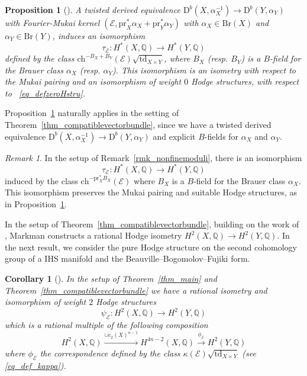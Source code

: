 \documentclass[12pt,a4paper]{amsart}
\theoremstyle{plain}
\newtheorem{prop}[thm]{Proposition}
\newtheorem{cor}[thm]{Corollary}
\theoremstyle{definition}
\theoremstyle{remark}
\newtheorem{rmk}[thm]{Remark}
\def\td{\operatorname{td}}
\def\ch{\mathrm{ch}}
\def\H{H}
\def\pr{\mathrm{pr}}
\def\QQ{\mathbb{Q}}
\newcommand{\D}{\mathrm{D}^b}
\newcommand{\kE}{\mathcal{E}}
\newcommand{\Br}{\mathrm{Br}}
\newcommand{\rathodge}[1]{\psi_{#1}}
\newcommand{\cc}{c}
\begin{document}
\begin{prop}[{\cite[Section 4, 4) and 5)]{paolo_huy}}]\label{huystellari}
    A twisted derived equivalence $\D(X,\alpha_X^{-1})\to \D(Y,\alpha_Y)$ with Fourier-Mukai kernel $(\kE,\pr_X^*\alpha_X+\pr_Y^*{\alpha_Y})$ with $\alpha_X\in \Br(X)$ and $\alpha_Y\in\Br(Y)$, induces an isomorphism
    \[
    \tau_{\kE}\colon H^*(X,\QQ)\to H^*(Y,\QQ)
    \]
    defined by the class $\ch^{-B_X+B_Y}(\kE)\sqrt{\td_{X\times Y}}$, where $B_X$ (resp. $B_Y$) is a $B$-field for the Brauer class $\alpha_X$ (resp. $\alpha_Y$). 
    This isomorphism is an isometry with respect to the Mukai pairing and an isomorphism of weight $0$ Hodge structures, with respect to ~\eqref{eq_defzeroHstru}.
\end{prop}


Proposition~\ref{huystellari} naturally applies in the setting of Theorem~\ref{thm_compatiblevectorbundle}, since we have a twisted derived equivalence $\D(X,\alpha_X^{-1})\rightarrow\D(Y,\alpha_Y)$ and explicit $B$-fields for $\alpha_X$ and $\alpha_Y$.

\begin{rmk}\label{rmk_iso_nonfine}
    In the setup of Remark~\ref{rmk_nonfinemoduli}, there is an isomorphism
    \[
    \tau_{\kE}\colon H^*(X,\QQ)\to H^*(Y,\QQ)
    \]
    induced by the class $\ch^{-\pr_X^*B_X}(\kE)$ where $B_X$ is a $B$-field for the Brauer class $\alpha_X$. This isomorphism preserves the Mukai pairing and suitable Hodge structures, as in Proposition~\ref{huystellari}.
\end{rmk}


In the setup of Theorem~\ref{thm_compatiblevectorbundle}, building on the work of \cite{tae23}, Markman constructs a rational Hodge isometry $H^2(X,\mathbb{Q})\rightarrow H^2(Y,\mathbb{Q})$. In the next result, we consider the pure Hodge structure on the second cohomology group of a IHS manifold and the Beauville--Bogomolov--Fujiki form.

\begin{cor}[{\cite[Lemma 4.1 and Theorem 1.1]{markman}}]\label{cor_2}
	In the setup of Theorem~\ref{thm_main} and Theorem~\ref{thm_compatiblevectorbundle} we have a rational isometry and isomorphism of weight $2$ Hodge structures
	\begin{equation}
		 \rathodge{\kE}\colon\H^2(X,\mathbb{Q})\to \H^2(Y,\mathbb{Q})
	\end{equation}
	which is a rational multiple of the following composition
	\begin{equation}
		\H^2(X,\QQ)\xrightarrow{\cup \cc_2(X)^{n-1}}\H^{4n-2}(X,\QQ)\overset{\phi_{\kE}}{\longrightarrow}\H^2(Y,\QQ)
		\end{equation}
		where $\phi_{\kE}$ the correspondence defined by the class $\kappa(\kE)\sqrt{\td_{X\times Y}}$ (see \eqref{eq_def_kappa}).
\end{cor}
\end{document}
